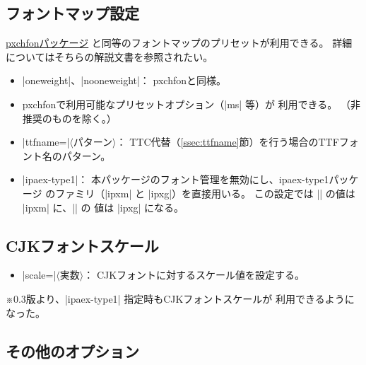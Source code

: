 \documentclass[a4paper]{ltjsarticle}
\newcommand{\Pkg}[1]{\textsf{#1}}
\newcommand{\Meta}[1]{$\langle$\mbox{}#1\mbox{}$\rangle$}
\newcommand{\Note}{\par\noindent ※}
\newcommand{\Means}{：\quad}
\begin{document}
\subsection{フォントマップ設定}

\href{http://www.ctan.org/pkg/pxchfon}{\Pkg{pxchfon}パッケージ}%
と同等のフォントマップのプリセットが利用できる。
詳細についてはそちらの解説文書を参照されたい。

\begin{itemize}
\item |oneweight|、|nooneweight|\Means
  \Pkg{pxchfon}と同様。
\item \Pkg{pxchfon}で利用可能なプリセットオプション（|ms| 等）が
  利用できる。
  （非推奨のものを除く。）
\item |ttfname=|\Meta{パターン}\Means
  TTC代替（\ref{ssec:ttfname}節）を行う場合のTTFフォント名のパターン。
\item |ipaex-type1|\Means
  本パッケージのフォント管理を無効にし、\Pkg{ipaex-type1}パッケージ
  のファミリ（|ipxm| と |ipxg|）を直接用いる。
  この設定では |\mcdefault| の値は |ipxm| に、|\gtdefault| の
  値は |ipxg| になる。
\end{itemize}

\subsection{CJKフォントスケール}

\begin{itemize}
\item |scale=|\Meta{実数}\Means
  CJKフォントに対するスケール値を設定する。
\end{itemize}

\Note 0.3版より、|ipaex-type1| 指定時もCJKフォントスケールが
利用できるようになった。

\subsection{その他のオプション}
\end{document}
